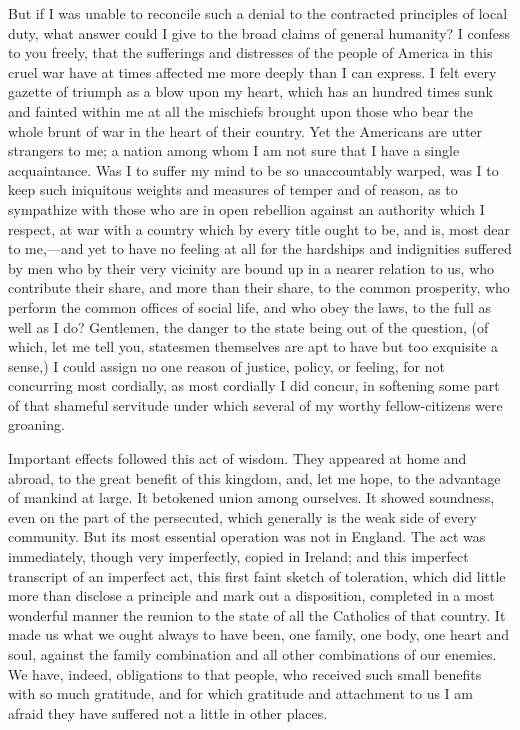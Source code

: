 But if I was unable to reconcile such a denial to the contracted principles of local duty, what answer could I give to the broad claims of general humanity? I confess to you freely, that the sufferings and distresses of the people of America in this cruel war have at times affected me more deeply than I can express. I felt every gazette of triumph as a blow upon my heart, which has an hundred times sunk and fainted within me at all the mischiefs brought upon those who bear the whole brunt of war in the heart of their country. Yet the Americans are utter strangers to me; a nation among whom I am not sure that I have a single acquaintance. Was I to suffer my mind to be so unaccountably warped, was I to keep such iniquitous weights and measures of temper and of reason, as to sympathize with those who are in open rebellion against an authority which I respect, at war with a country which by every title ought to be, and is, most dear to me,—and yet to have no feeling at all for the hardships and indignities suffered by men who by their very vicinity are bound up in a nearer relation to us, who contribute their share, and more than their share, to the common prosperity, who perform the common offices of social life, and who obey the laws, to the full as well as I do? Gentlemen, the danger to the state being out of the question, (of which, let me tell you, statesmen themselves are apt to have but too exquisite a sense,) I could assign no one reason of justice, policy, or feeling, for not concurring most cordially, as most cordially I did concur, in softening some part of that shameful servitude under which several of my worthy fellow-citizens were groaning.

Important effects followed this act of wisdom. They appeared at home and abroad, to the great benefit of this kingdom, and, let me hope, to the advantage of mankind at large. It betokened union among ourselves. It showed soundness, even on the part of the persecuted, which generally is the weak side of every community. But its most essential operation was not in England. The act was immediately, though very imperfectly, copied in Ireland; and this imperfect transcript of an imperfect act, this first faint sketch of toleration, which did little more than disclose a principle and mark out a disposition, completed in a most wonderful manner the reunion to the state of all the Catholics of that country. It made us what we ought always to have been, one family, one body, one heart and soul, against the family combination and all other combinations of our enemies. We have, indeed, obligations to that people, who received such small benefits with so much gratitude, and for which gratitude and attachment to us I am afraid they have suffered not a little in other places.


